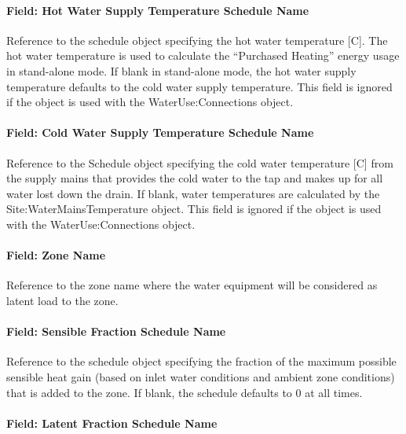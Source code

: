 \paragraph{Field: Hot Water Supply Temperature Schedule Name}\label{field-hot-water-supply-temperature-schedule-name}

Reference to the schedule object specifying the hot water temperature {[}C{]}. The hot water temperature is used to calculate the ``Purchased Heating'' energy usage in stand-alone mode. If blank in stand-alone mode, the hot water supply temperature defaults to the cold water supply temperature. This field is ignored if the object is used with the WaterUse:Connections object.

\paragraph{Field: Cold Water Supply Temperature Schedule Name}\label{field-cold-water-supply-temperature-schedule-name-000}

Reference to the Schedule object specifying the cold water temperature {[}C{]} from the supply mains that provides the cold water to the tap and makes up for all water lost down the drain. If blank, water temperatures are calculated by the Site:WaterMainsTemperature object. This field is ignored if the object is used with the WaterUse:Connections object.

\paragraph{Field: Zone Name}\label{field-zone-name-013}

Reference to the zone name where the water equipment will be considered as latent load to the zone.

\paragraph{Field: Sensible Fraction Schedule Name}\label{field-sensible-fraction-schedule-name}

Reference to the schedule object specifying the fraction of the maximum possible sensible heat gain (based on inlet water conditions and ambient zone conditions) that is added to the zone. If blank, the schedule defaults to 0 at all times.

\paragraph{Field: Latent Fraction Schedule Name}\label{field-latent-fraction-schedule-name}

